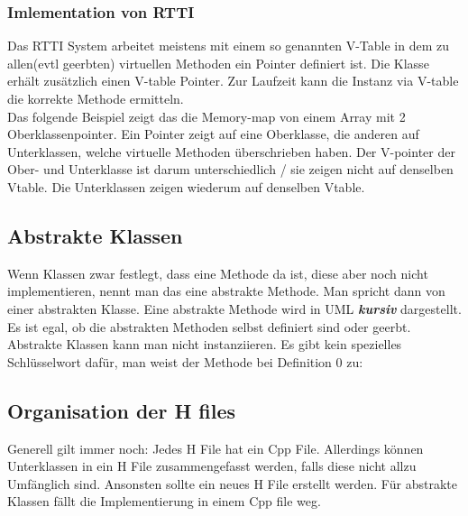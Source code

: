 

\subsubsection{Imlementation von RTTI}

Das RTTI System arbeitet meistens mit einem so genannten V-Table in dem zu allen(evtl geerbten) virtuellen Methoden ein Pointer definiert ist. 
Die Klasse erhält zusätzlich einen V-table Pointer. 
Zur Laufzeit kann die Instanz via V-table die korrekte Methode ermitteln.\\

Das folgende Beispiel zeigt das die Memory-map von einem Array mit 2 Oberklassenpointer. 
Ein Pointer zeigt auf eine Oberklasse, die anderen auf Unterklassen, welche virtuelle Methoden überschrieben haben. 
Der V-pointer der Ober- und Unterklasse ist darum unterschiedlich / sie zeigen nicht auf denselben Vtable. 
Die Unterklassen zeigen wiederum auf denselben Vtable.  

\begin{center}
        
\end{center}

\nextcol

\subsection{Abstrakte Klassen}

Wenn Klassen zwar festlegt, dass eine Methode da ist, diese aber noch nicht implementieren, nennt man das eine abstrakte Methode. 
Man spricht dann von einer abstrakten Klasse.
Eine abstrakte Methode wird in UML \textit{\textbf{kursiv}} dargestellt.
Es ist egal, ob die abstrakten Methoden selbst definiert sind oder geerbt. 
Abstrakte Klassen kann man nicht instanziieren.
Es gibt kein spezielles Schlüsselwort dafür, man weist der Methode bei Definition 0 zu: 



\subsection{Organisation der H files}

Generell gilt immer noch: Jedes H File hat ein Cpp File. 
Allerdings können Unterklassen in ein H File zusammengefasst werden, falls diese nicht allzu Umfänglich sind. 
Ansonsten sollte ein neues H File erstellt werden. 
Für abstrakte Klassen fällt die Implementierung in einem Cpp file weg.

